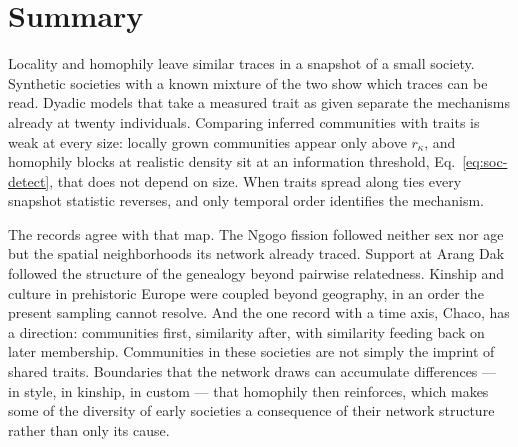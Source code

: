 \section{Summary}

Locality and homophily leave similar traces in a snapshot of a small society. Synthetic
societies with a known mixture of the two show which traces can be read. Dyadic models
that take a measured trait as given separate the mechanisms already at twenty
individuals. Comparing inferred communities with traits is weak at every size: locally
grown communities appear only above $r_\kappa$, and homophily blocks at realistic density
sit at an information threshold, Eq.~\eqref{eq:soc-detect}, that does not depend on size.
When traits spread along ties every snapshot statistic reverses, and only temporal order
identifies the mechanism.

The records agree with that map. The Ngogo fission followed neither sex nor age but the
spatial neighborhoods its network already traced. Support at Arang Dak followed the
structure of the genealogy beyond pairwise relatedness. Kinship and culture in prehistoric
Europe were coupled beyond geography, in an order the present sampling cannot resolve. And
the one record with a time axis, Chaco, has a direction: communities first, similarity
after, with similarity feeding back on later membership. Communities in these societies
are not simply the imprint of shared traits. Boundaries that the network draws can
accumulate differences --- in style, in kinship, in custom --- that homophily then
reinforces, which makes some of the diversity of early societies a consequence of their
network structure rather than only its cause.
